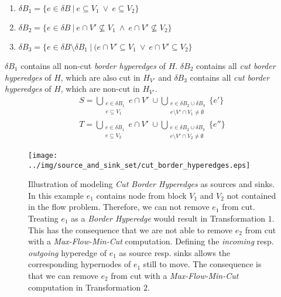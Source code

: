 \begin{enumerate}
\item $\delta B_1 = \{ e \in \delta B \ |\ e \subseteq V_1\ \lor\ e \subseteq V_2 \}$
\item $\delta B_2 = \{ e \in \delta B \ |\ e \cap V' \not\subseteq V_1\ \land\ e \cap V' \not\subseteq V_2\}$
\item $\delta B_3 = \{ e \in \delta B \setminus \delta B_1 \ |\ (e \cap V' \subseteq V_1\ \lor\ e \cap V' \subseteq V_2 \}$
\end{enumerate}

$\delta B_1$ contains all non-cut \emph{border hyperedges} of $H$. $\delta B_2$ contains 
all \emph{cut border hyperedges} of $H$, which are also cut in $H_{V'}$ and $\delta B_3$ contains
all \emph{cut border hyperedges} of $H$, which are non-cut in $H_{V'}$.
\begin{align}
S = \bigcup\limits_{\substack{e \in \delta B_1 \\ e \subseteq V_1}} e\cap V'\ \cup \bigcup\limits_{\substack{e \in \delta B_2 \cup \delta B_3 \\ e \setminus V' \cap V_1 \neq \emptyset}} \{e'\} \label{S_final_border_hyperedges}\\
T = \bigcup\limits_{\substack{e \in \delta B_1 \\ e \subseteq V_2}} e\cap V'\ \cup \bigcup\limits_{\substack{e \in \delta B_2 \cup \delta B_3 \\ e \setminus V' \cap V_2 \neq \emptyset}} \{e''\} \label{T_final_border_hyperedges}
\end{align}

\begin{figure}
\centering
\texttt{[image: ../img/source\_and\_sink\_set/cut\_border\_hyperedges.eps]}
\caption{Illustration of modeling \emph{Cut Border Hyperedges} as sources and sinks. In this
         example $e_1$ contains node from block $V_1$ and $V_2$ not contained in the flow problem. Therefore,
         we can not remove $e_1$ from cut. Treating $e_1$ as a \emph{Border Hyperedge} would result
         in Transformation $1$. This has the consequence that we are not able to remove $e_2$
         from cut with a \emph{Max-Flow-Min-Cut} computation. Defining the \emph{incoming} resp.
         \emph{outgoing} hyperedge of $e_1$ as source resp. sinks allows the corresponding hypernodes
         of $e_1$ still to move. The consequence is that we can remove $e_2$ from cut with a
         \emph{Max-Flow-Min-Cut} computation in Transformation $2$.}
\label{img:cut_border_hyperedges}
\end{figure}

